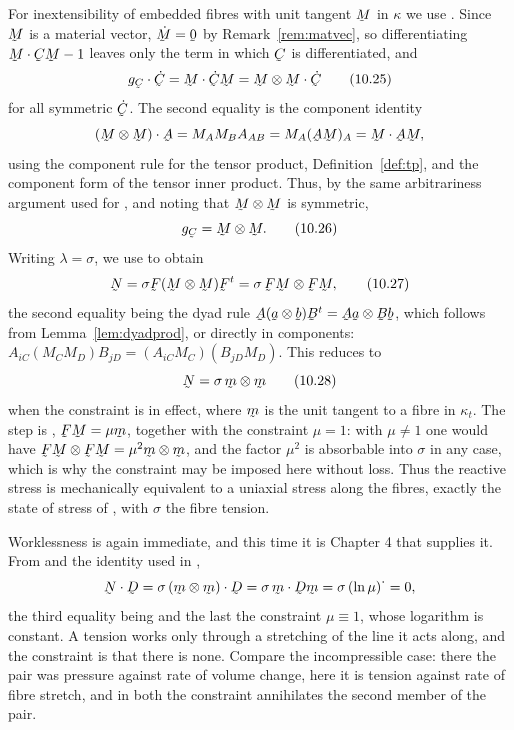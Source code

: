 For inextensibility of embedded fibres with unit tangent $\bM$ in
$\kappa$ we use . Since $\bM$ is a material vector,
$\dot\bM=\bze$ by Remark~\ref{rem:matvec}, so differentiating
$\ip\bM{\bC\bM}-1$ leaves only the term in which $\bC$ is
differentiated, and
\begin{equation}
   g_{\bC}\cdot\dot\bC=\ip\bM{\dot\bC\bM}=\bM\otimes\bM\cdot\dot\bC
   \tag{10.25}\label{eq:10.25}
\end{equation}
for all symmetric $\dot\bC$. The second equality is the component
identity
\[
   (\bM\otimes\bM)\cdot\bA=M_{A}M_{B}A_{AB}=M_{A}(\bA\bM)_{A}
   =\ip\bM{\bA\bM},
\]
using the component rule for the tensor product, Definition~\ref{def:tp},
and the component form of the tensor inner product. Thus, by the same
arbitrariness argument used for , and noting that
$\bM\otimes\bM$ is symmetric,
\begin{equation}
   g_{\bC}=\bM\otimes\bM .
   \tag{10.26}\label{eq:10.26}
\end{equation}
Writing $\lambda=\sigma$, we use  to obtain
\begin{equation}
   \bN=\sigma\bF(\bM\otimes\bM)\bF^{t}=\sigma\,\bF\bM\otimes\bF\bM ,
   \tag{10.27}\label{eq:10.27}
\end{equation}
the second equality being the dyad rule $\bA(\ba\otimes\bb)\bB^{t}
=\bA\ba\otimes\bB\bb$, which follows from Lemma~\ref{lem:dyadprod}, or
directly in components:
$A_{iC}(M_{C}M_{D})B_{jD}=(A_{iC}M_{C})(B_{jD}M_{D})$. This reduces to
\begin{equation}
   \bN=\sigma\,\bm\otimes\bm
   \tag{10.28}\label{eq:10.28}
\end{equation}
when the constraint is in effect, where $\bm$ is the unit tangent to a
fibre in $\kappa_{t}$. The step is , $\bF\bM=\mu\bm$, together
with the constraint $\mu=1$: with $\mu\neq1$ one would have
$\bF\bM\otimes\bF\bM=\mu^{2}\bm\otimes\bm$, and the factor $\mu^{2}$ is
absorbable into $\sigma$ in any case, which is why the constraint may be
imposed here without loss. Thus the reactive stress is mechanically
equivalent to a uniaxial stress along the fibres, exactly the state of
stress of , with $\sigma$ the fibre tension.

Worklessness is again immediate, and this time it is Chapter 4 that
supplies it. From  and the identity used in ,
\[
   \bN\cdot\bD=\sigma\,(\bm\otimes\bm)\cdot\bD=\sigma\,\ip\bm{\bD\bm}
   =\sigma\,(\ln\mu)^{\textstyle\cdot}=0 ,
\]
the third equality being  and the last the constraint
$\mu\equiv1$, whose logarithm is constant. A tension works only through
a stretching of the line it acts along, and the constraint is that there
is none. Compare the incompressible case: there the pair was pressure
against rate of volume change, here it is tension against rate of fibre
stretch, and in both the constraint annihilates the second member of the
pair.

